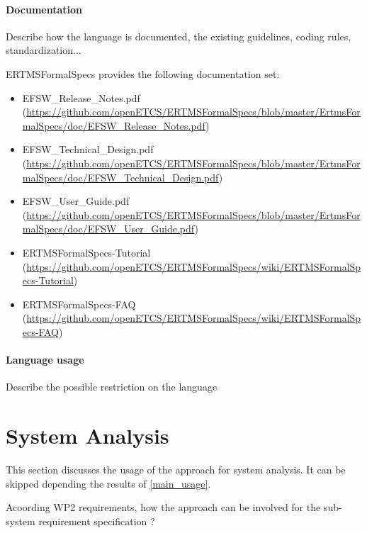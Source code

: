 \paragraph{Documentation} Describe how the language is documented, the existing guidelines, coding rules, standardization...

ERTMSFormalSpecs provides the following documentation set:

\begin{itemize}
	\item EFSW\_Release\_Notes.pdf (\url{https://github.com/openETCS/ERTMSFormalSpecs/blob/master/ErtmsFormalSpecs/doc/EFSW\_Release\_Notes.pdf})
	\item EFSW\_Technical\_Design.pdf (\url{https://github.com/openETCS/ERTMSFormalSpecs/blob/master/ErtmsFormalSpecs/doc/EFSW\_Technical\_Design.pdf})
	\item EFSW\_User\_Guide.pdf (\url{https://github.com/openETCS/ERTMSFormalSpecs/blob/master/ErtmsFormalSpecs/doc/EFSW\_User\_Guide.pdf})
	\item ERTMSFormalSpecs-Tutorial (\url{https://github.com/openETCS/ERTMSFormalSpecs/wiki/ERTMSFormalSpecs-Tutorial})
	\item ERTMSFormalSpecs-FAQ (\url{https://github.com/openETCS/ERTMSFormalSpecs/wiki/ERTMSFormalSpecs-FAQ})
\end{itemize}

\paragraph{Language usage} Describe the possible restriction on the language

\section{System Analysis}
This section discusses the usage of the approach for system analysis.
It can be skipped depending the results of \ref{main_usage}.

Acoording WP2 requirements, how the approach can be involved for the sub-system requirement specification ?

